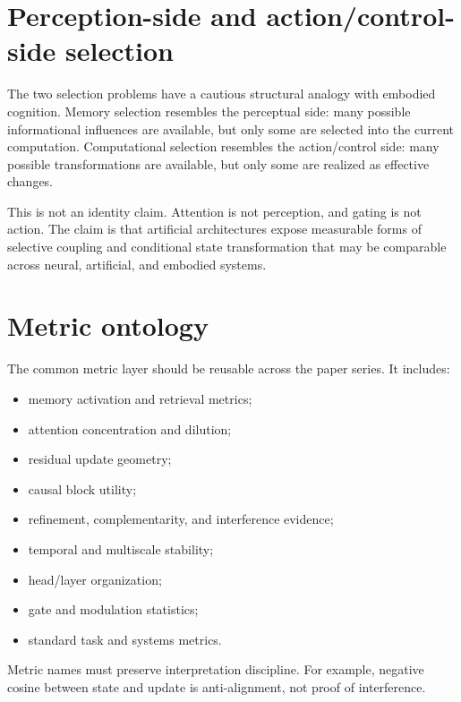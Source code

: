 \documentclass[10pt]{article}
\begin{document}
\section{Perception-side and action/control-side selection}
The two selection problems have a cautious structural analogy with embodied cognition. Memory selection resembles the perceptual side: many possible informational influences are available, but only some are selected into the current computation. Computational selection resembles the action/control side: many possible transformations are available, but only some are realized as effective changes.

This is not an identity claim. Attention is not perception, and gating is not action. The claim is that artificial architectures expose measurable forms of selective coupling and conditional state transformation that may be comparable across neural, artificial, and embodied systems.

\section{Metric ontology}
The common metric layer should be reusable across the paper series. It includes:
\begin{itemize}[leftmargin=*]
\item memory activation and retrieval metrics;
\item attention concentration and dilution;
\item residual update geometry;
\item causal block utility;
\item refinement, complementarity, and interference evidence;
\item temporal and multiscale stability;
\item head/layer organization;
\item gate and modulation statistics;
\item standard task and systems metrics.
\end{itemize}

Metric names must preserve interpretation discipline. For example, negative cosine between state and update is anti-alignment, not proof of interference.
\end{document}

